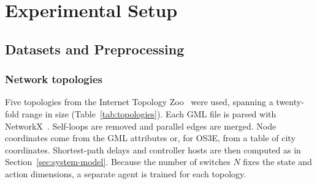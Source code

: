\chapter{Experimental Setup}
\label{ch:setup}

\section{Datasets and Preprocessing}
\label{sec:data}

\subsection{Network topologies}

Five topologies from the Internet Topology Zoo~\cite{knight2011zoo} were used, spanning a twenty-fold range in size (Table~\ref{tab:topologies}). Each GML file is parsed with NetworkX~\cite{hagberg2008networkx}. Self-loops are removed and parallel edges are merged. Node coordinates come from the GML attributes or, for OS3E, from a table of city coordinates. Shortest-path delays and controller hosts are then computed as in Section~\ref{sec:system-model}. Because the number of switches $N$ fixes the state and action dimensions, a separate agent is trained for each topology.

\begin{table}[htbp]
\centering
\caption{Topologies, selected controller hosts and resulting problem dimensions.}
\label{tab:topologies}
\small
{}
\end{table}

